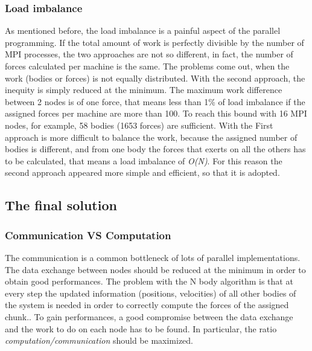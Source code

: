 \documentclass[a4paper]{article}
\begin{document}
\subsubsection{Load imbalance}
\label{sec:b_rep}
As mentioned before, the load imbalance is a painful aspect of the parallel programming. If the total amount of work is perfectly divisible by the number of MPI processes, the two approaches are not so different, in fact, the number of forces calculated per machine is the same. The problems come out, when the work (bodies or forces) is not equally distributed. With the second approach, the inequity is simply reduced at the minimum. The maximum work difference between 2 nodes is of one force, that means less than 1\% of load imbalance if the assigned forces per machine are more than 100. To reach this bound with 16 MPI nodes, for example, 58 bodies (1653 forces) are sufficient. With the First approach is more difficult to balance the work, because the assigned number of bodies is different, and from one body the forces that exerts on all the others has to be calculated, that means a load imbalance of \textit{O(N)}. For this reason the second approach appeared more simple and efficient, so that it is adopted.


\subsection{The final solution}
\label{sec:comm_comp}

\subsubsection{Communication VS Computation}
\label{sec:comm_comp}
The communication is a common bottleneck of lots of parallel implementations. The data exchange between nodes should be reduced at the minimum in order to obtain good performances. The problem with the N body algorithm is that at every step the updated information (positions, velocities) of all other bodies of the system is needed in order to correctly compute the forces of the assigned chunk.. To gain performances, a good compromise between the data exchange and the work to do on each node has to be found. In particular, the ratio \textit{computation/communication} should be maximized. 
\end{document}
